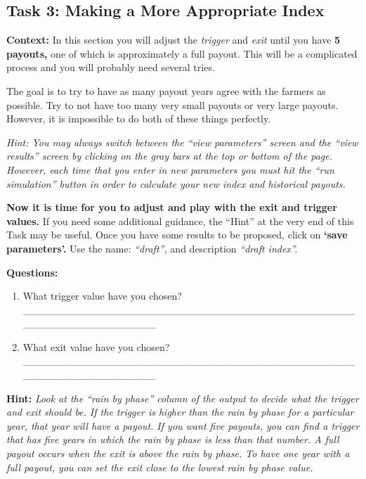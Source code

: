 \documentclass[letterpaper,10pt,english]{sphinxmanual}
\begin{document}
\subsection{Task 3: Making a More Appropriate Index}
\label{wiiet/wiiet_usingfarmerinformation_Web:task-3-making-a-more-appropriate-index}
\textbf{Context:} In this section you will adjust the \emph{trigger} and \emph{exit} until you have \textbf{5 payouts,} one of which is approximately a full payout. This will be a complicated process and you will probably need several tries.

The goal is to try to have as many payout years agree with the farmers as possible.  Try to not have too many very small payouts or very large payouts. However, it is impossible to do both of these things perfectly.

\emph{Hint: You may always switch between the ``view parameters'' screen and the ``view results'' screen by clicking on the gray bars at the top or bottom of the page. However, each time that you enter in new parameters you must hit the ``run simulation'' button in order to calculate your new index and historical payouts.}

\textbf{Now it is time for you to adjust and play with the exit and trigger values.} If you need some additional guidance, the ``Hint'' at the very end of this Task may be useful. Once you have some results to be proposed, click on \textbf{`save parameters'.} Use the name: \emph{``draft'',} and description \emph{``draft index''.}

\textbf{Questions:}
\begin{enumerate}
\item {} 
What trigger value have you chosen? \_\_\_\_\_\_\_\_\_\_\_\_\_\_\_\_\_\_\_\_\_\_\_\_\_\_\_\_\_\_\_\_\_\_\_\_\_\_\_\_\_\_\_\_\_\_\_\_\_\_\_\_\_\_\_\_\_\_\_\_\_\_\_

\item {} 
What exit value have you chosen? \_\_\_\_\_\_\_\_\_\_\_\_\_\_\_\_\_\_\_\_\_\_\_\_\_\_\_\_\_\_\_\_\_\_\_\_\_\_\_\_\_\_\_\_\_\_\_\_\_\_\_\_\_\_\_\_\_\_\_\_\_\_\_

\end{enumerate}

\textbf{Hint:}
\emph{Look at the ``rain by phase'' column of the output to decide what the trigger and exit should be. If the trigger is higher than the rain by phase for a particular year, that year will have a payout. If you want five payouts, you can find a trigger that has five years in which the rain by phase is less than that number. A full payout occurs when the exit is above the rain by phase. To have one year with a full payout, you can set the exit close to the lowest rain by phase value.}
\end{document}
